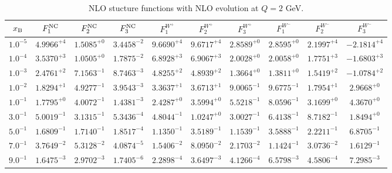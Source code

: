 \begin{table}[h]
\begin{adjustbox}{width=\textwidth}
\begin{tabular}{|c||c|c|c|c|c|c|c|c|c|}
\hline
$x_{\rm B}$ & $F_1^{\rm NC}$ & $F_2^{\rm NC}$ & $F_3^{\rm NC}$ & $F_1^{W^+}$ & $F_2^{W^+}$ & $F_3^{W^+}$ & $F_1^{W^-}$ & $F_2^{W^-}$ & $F_3^{W^-}$ \\
\hline
$ 1.0^{-5}$ & $ 4.9966^{+4}$ & $ 1.5085^{+0}$ & $ 3.4458^{-2}$ & $ 9.6690^{+4}$ & $ 9.6717^{+4}$ & $ 2.8589^{+0}$ & $ 2.8595^{+0}$ & $ 2.1997^{+4}$ & $-2.1814^{+4}$ \\
$ 1.0^{-4}$ & $ 3.5370^{+3}$ & $ 1.0505^{+0}$ & $ 1.7875^{-2}$ & $ 6.8928^{+3}$ & $ 6.9067^{+3}$ & $ 2.0028^{+0}$ & $ 2.0058^{+0}$ & $ 1.7751^{+3}$ & $-1.6803^{+3}$ \\
$ 1.0^{-3}$ & $ 2.4761^{+2}$ & $ 7.1563^{-1}$ & $ 8.7463^{-3}$ & $ 4.8255^{+2}$ & $ 4.8939^{+2}$ & $ 1.3664^{+0}$ & $ 1.3811^{+0}$ & $ 1.5419^{+2}$ & $-1.0784^{+2}$ \\
$ 1.0^{-2}$ & $ 1.8294^{+1}$ & $ 4.9277^{-1}$ & $ 3.9543^{-3}$ & $ 3.3637^{+1}$ & $ 3.6713^{+1}$ & $ 9.0065^{-1}$ & $ 9.6775^{-1}$ & $ 1.7954^{+1}$ & $ 2.9668^{+0}$ \\
$ 1.0^{-1}$ & $ 1.7795^{+0}$ & $ 4.0072^{-1}$ & $ 1.4381^{-3}$ & $ 2.4287^{+0}$ & $ 3.5994^{+0}$ & $ 5.5218^{-1}$ & $ 8.0596^{-1}$ & $ 3.1699^{+0}$ & $ 4.3670^{+0}$ \\
$ 3.0^{-1}$ & $ 5.0019^{-1}$ & $ 3.1315^{-1}$ & $ 5.3436^{-4}$ & $ 4.8044^{-1}$ & $ 1.0247^{+0}$ & $ 3.0027^{-1}$ & $ 6.4138^{-1}$ & $ 8.7182^{-1}$ & $ 1.8494^{+0}$ \\
$ 5.0^{-1}$ & $ 1.6809^{-1}$ & $ 1.7140^{-1}$ & $ 1.8517^{-4}$ & $ 1.1350^{-1}$ & $ 3.5189^{-1}$ & $ 1.1539^{-1}$ & $ 3.5888^{-1}$ & $ 2.2211^{-1}$ & $ 6.8705^{-1}$ \\
$ 7.0^{-1}$ & $ 3.7649^{-2}$ & $ 5.3128^{-2}$ & $ 4.0874^{-5}$ & $ 1.5406^{-2}$ & $ 8.0950^{-2}$ & $ 2.1703^{-2}$ & $ 1.1424^{-1}$ & $ 3.0736^{-2}$ & $ 1.6129^{-1}$ \\
$ 9.0^{-1}$ & $ 1.6475^{-3}$ & $ 2.9702^{-3}$ & $ 1.7405^{-6}$ & $ 2.2898^{-4}$ & $ 3.6497^{-3}$ & $ 4.1266^{-4}$ & $ 6.5798^{-3}$ & $ 4.5806^{-4}$ & $ 7.2985^{-3}$ \\
\hline
\end{tabular}
\end{adjustbox}\caption{NLO stucture functions with NLO evolution at $Q = 2$ GeV.}
\label{tab:N1LO-Q2}
\end{table}


